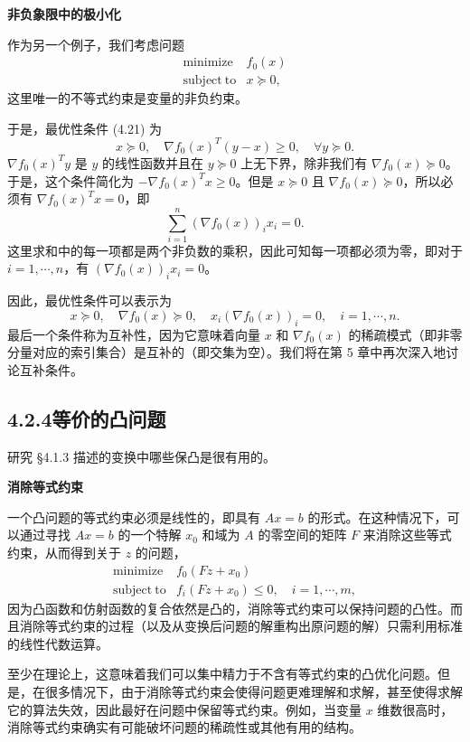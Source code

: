 \documentclass[UTF8, 12pt, fontset=fandol, oneside]{ctexart}
\begin{document}
\noindent\textbf{非负象限中的极小化}

作为另一个例子，我们考虑问题
\[
\begin{array}{ll}
\mathop{\mathrm{minimize}} & f_0(x)\\
\mathrm{subject\ to} & x\succeq 0,
\end{array}
\]
这里唯一的不等式约束是变量的非负约束。

于是，最优性条件 (4.21) 为
\[
x\succeq 0,\quad \nabla f_0(x)^T(y-x)\geq 0,\quad \forall y\succeq 0.
\]
$\nabla f_0(x)^Ty$ 是 $y$ 的线性函数并且在 $y\succeq 0$ 上无下界，除非我们有 $\nabla f_0(x)\succeq 0$。于是，这个条件简化为 $-\nabla f_0(x)^Tx\geq 0$。但是 $x\succeq 0$ 且 $\nabla f_0(x)\succeq 0$，所以必须有 $\nabla f_0(x)^Tx=0$，即
\[
\sum_{i=1}^{n}(\nabla f_0(x))_i x_i=0.
\]
这里求和中的每一项都是两个非负数的乘积，因此可知每一项都必须为零，即对于 $i=1,\cdots,n$，有 $(\nabla f_0(x))_i x_i=0$。

因此，最优性条件可以表示为
\[
x\succeq 0,\quad \nabla f_0(x)\succeq 0,\quad x_i(\nabla f_0(x))_i=0,\quad i=1,\cdots,n.
\]
最后一个条件称为互补性，因为它意味着向量 $x$ 和 $\nabla f_0(x)$ 的稀疏模式（即非零分量对应的索引集合）是互补的（即交集为空）。我们将在第 5 章中再次深入地讨论互补条件。

\subsection*{4.2.4\quad 等价的凸问题}

研究 §4.1.3 描述的变换中哪些保凸是很有用的。

\noindent\textbf{消除等式约束}

一个凸问题的等式约束必须是线性的，即具有 $Ax=b$ 的形式。在这种情况下，可以通过寻找 $Ax=b$ 的一个特解 $x_0$ 和域为 $A$ 的零空间的矩阵 $F$ 来消除这些等式约束，从而得到关于 $z$ 的问题，
\[
\begin{array}{ll}
\mathop{\mathrm{minimize}} & f_0(Fz+x_0)\\
\mathrm{subject\ to} & f_i(Fz+x_0)\leq 0,\quad i=1,\cdots,m,
\end{array}
\]
因为凸函数和仿射函数的复合依然是凸的，消除等式约束可以保持问题的凸性。而且消除等式约束的过程（以及从变换后问题的解重构出原问题的解）只需利用标准的线性代数运算。

至少在理论上，这意味着我们可以集中精力于不含有等式约束的凸优化问题。但是，在很多情况下，由于消除等式约束会使得问题更难理解和求解，甚至使得求解它的算法失效，因此最好在问题中保留等式约束。例如，当变量 $x$ 维数很高时，消除等式约束确实有可能破坏问题的稀疏性或其他有用的结构。
\end{document}
